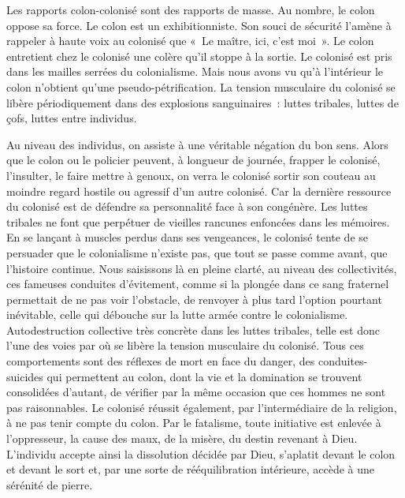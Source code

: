 \documentclass[french,twoside]{book} %
\begin{document}
\bigbreak
\noindent Les rapports colon-colonisé sont des rapports de masse. Au nombre, le colon oppose sa force. Le colon est un exhibitionniste. Son souci de sécurité l’amène à rappeler à haute voix au colonisé que « Le maître, ici, c’est moi ». Le colon entretient chez le colonisé une colère qu’il stoppe à la sortie. Le colonisé est pris dans les mailles serrées du colonialisme. Mais nous avons vu qu’à l’intérieur le colon n’obtient qu’une pseudo-pétrification. La tension musculaire du colonisé se libère périodiquement dans des explosions sanguinaires : luttes tribales, luttes de çofs, luttes entre individus.\par
Au niveau des individus, on assiste à une véritable négation du bon sens. Alors que le colon ou le policier peuvent, à longueur de journée, frapper le colonisé, l’insulter, le faire mettre à genoux, on verra le colonisé sortir son couteau au moindre regard hostile ou agressif d’un autre colonisé. Car la dernière ressource du colonisé est de défendre sa personnalité face à son congénère. Les luttes tribales ne font que perpétuer de vieilles rancunes enfoncées dans les mémoires. En se lançant à muscles perdus dans ses vengeances, le colonisé tente de se persuader que le colonialisme n’existe pas, que tout se passe comme avant, que l’histoire continue. Nous saisissons là en pleine clarté, au niveau des collectivités, ces fameuses conduites d’évitement, comme si la plongée dans ce sang fraternel permettait de ne pas voir l’obstacle, de renvoyer à plus tard l’option pourtant inévitable, celle qui débouche sur la lutte armée contre le colonialisme. Autodestruction collective très concrète dans les luttes tribales, telle est donc l’une des voies par où se libère la tension musculaire du colonisé. Tous ces comportements sont des réflexes de mort en face du danger, des conduites-suicides qui permettent au colon, dont la vie et la domination se trouvent   consolidées d’autant, de vérifier par la même occasion que ces hommes ne sont pas raisonnables. Le colonisé réussit également, par l’intermédiaire de la religion, à ne pas tenir compte du colon. Par le fatalisme, toute initiative est enlevée à l’oppresseur, la cause des maux, de la misère, du destin revenant à Dieu. L’individu accepte ainsi la dissolution décidée par Dieu, s’aplatit devant le colon et devant le sort et, par une sorte de rééquilibration intérieure, accède à une sérénité de pierre.\par
\end{document}
